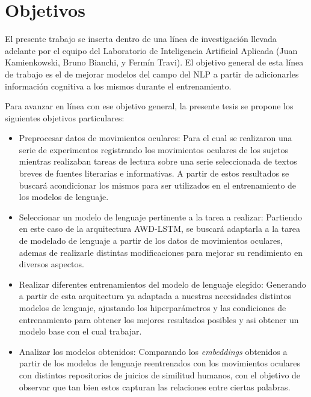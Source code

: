 \chapter{Objetivos}

El presente trabajo se inserta dentro de una línea de investigación llevada adelante por el equipo del Laboratorio de Inteligencia Artificial Aplicada (Juan Kamienkowski, Bruno Bianchi, y Fermín Travi). El objetivo general de esta línea de trabajo es el de mejorar modelos del campo del NLP a partir de adicionarles información cognitiva a los mismos durante el entrenamiento.

Para avanzar en línea con ese objetivo general, la presente tesis se propone los siguientes objetivos particulares:
\begin{itemize}
    \item Preprocesar datos de movimientos oculares: Para el cual se realizaron una serie de experimentos registrando los movimientos oculares de los sujetos mientras realizaban tareas de lectura sobre una serie seleccionada de textos breves de fuentes literarias e informativas. A partir de estos resultados se buscará acondicionar los mismos para ser utilizados en el entrenamiento de los modelos de lenguaje.
    \item Seleccionar un modelo de lenguaje pertinente a la tarea a realizar: Partiendo en este caso de la arquitectura AWD-LSTM, se buscará adaptarla a la tarea de modelado de lenguaje a partir de los datos de movimientos oculares, ademas de realizarle distintas modificaciones para mejorar su rendimiento en diversos aspectos.
    \item Realizar diferentes entrenamientos del modelo de lenguaje elegido: Generando a partir de esta arquitectura ya adaptada a nuestras necesidades distintos modelos de lenguaje, ajustando los hiperparámetros y las condiciones de entrenamiento para obtener los mejores resultados posibles y asi obtener un modelo base con el cual trabajar.
    \item Analizar los modelos obtenidos: Comparando los \textit{embeddings} obtenidos a partir de los modelos de lenguaje reentrenados con los movimientos oculares con distintos repositorios de juicios de similitud humanos, con el objetivo de observar que tan bien estos capturan las relaciones entre ciertas palabras. 
\end{itemize}

